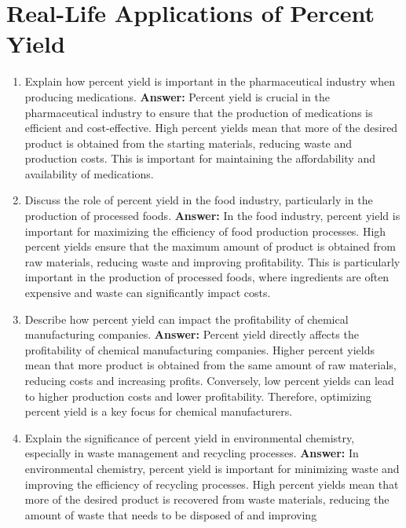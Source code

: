 \documentclass{article}
\begin{document}
\section*{Real-Life Applications of Percent Yield}

\begin{enumerate}
    \item Explain how percent yield is important in the pharmaceutical industry when producing medications.
    \textbf{Answer:} Percent yield is crucial in the pharmaceutical industry to ensure that the production of medications is efficient and cost-effective. High percent yields mean that more of the desired product is obtained from the starting materials, reducing waste and production costs. This is important for maintaining the affordability and availability of medications.

    \item Discuss the role of percent yield in the food industry, particularly in the production of processed foods.
    \textbf{Answer:} In the food industry, percent yield is important for maximizing the efficiency of food production processes. High percent yields ensure that the maximum amount of product is obtained from raw materials, reducing waste and improving profitability. This is particularly important in the production of processed foods, where ingredients are often expensive and waste can significantly impact costs.

    \item Describe how percent yield can impact the profitability of chemical manufacturing companies.
    \textbf{Answer:} Percent yield directly affects the profitability of chemical manufacturing companies. Higher percent yields mean that more product is obtained from the same amount of raw materials, reducing costs and increasing profits. Conversely, low percent yields can lead to higher production costs and lower profitability. Therefore, optimizing percent yield is a key focus for chemical manufacturers.

    \item Explain the significance of percent yield in environmental chemistry, especially in waste management and recycling processes.
    \textbf{Answer:} In environmental chemistry, percent yield is important for minimizing waste and improving the efficiency of recycling processes. High percent yields mean that more of the desired product is recovered from waste materials, reducing the amount of waste that needs to be disposed of and improving


\end{enumerate}
\end{document}
